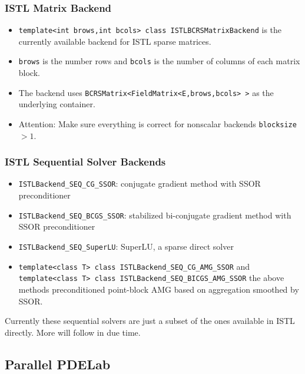 {\begin{frame}
  \frametitle{ISTL Matrix Backend}
  \begin{itemize} 
    \item \lstinline!template<int brows,int bcols> class ISTLBCRSMatrixBackend!
      is the currently available backend for ISTL sparse
      matrices.
    \item \lstinline!brows! is the number rows and \lstinline!bcols!
      is the number of columns of each matrix block.
  \item The backend uses
    \lstinline!BCRSMatrix<FieldMatrix<E,brows,bcols> >! as the
    underlying container.
  \item Attention: Make sure everything is correct for nonscalar backends
    \lstinline!blocksize!$>1$.
  \end{itemize}
\end{frame}
\begin{frame}[fragile]
  \frametitle{ISTL Sequential Solver Backends}
    \begin{itemize}
    \item \lstinline!ISTLBackend_SEQ_CG_SSOR!:  conjugate gradient method with SSOR preconditioner
    \item \lstinline!ISTLBackend_SEQ_BCGS_SSOR!: stabilized bi-conjugate gradient
      method with SSOR preconditioner
    \item \lstinline!ISTLBackend_SEQ_SuperLU!: SuperLU, a sparse
      direct solver
    \item \lstinline!template<class T> class ISTLBackend_SEQ_CG_AMG_SSOR! and
      \lstinline!template<class T> class ISTLBackend_SEQ_BICGS_AMG_SSOR! the
      above methods 
      preconditioned point-block AMG based on aggregation smoothed by SSOR.
    \end{itemize}
    Currently these sequential solvers are just a subset of the ones
  available in ISTL directly. More will follow in due time.
\end{frame}

\subsection{Parallel PDELab}
\label{sec:parallelization}


}
